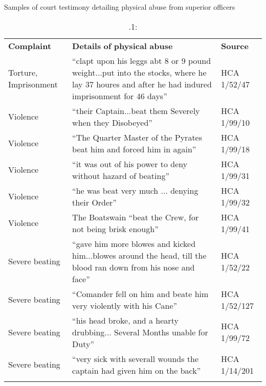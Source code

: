 \begin{table}
\caption{\label{tab:key:4}.1:} Samples of court testimony detailing physical abuse from superior officers

\begin{tabularx}{\textwidth}{XXX}
\lsptoprule

\textbf{Complaint} & \textbf{Details} \textbf{of} \textbf{physical} \textbf{abuse} & \textbf{Source}\\
Torture, Imprisonment & “clapt upon his leggs abt 8 or 9 pound weight...put into the stocks, where he lay 37 houres and after he had indured imprisonment for 46 days” & HCA 1/52/47\\
Violence & “their Captain...beat them Severely when they Disobeyed” & HCA 1/99/10\\
Violence & “The Quarter Master of the Pyrates beat him and forced him in again” & HCA 1/99/18\\
Violence & “it was out of his power to deny without hazard of beating” & HCA 1/99/31\\
Violence & “he was beat very much ... denying their Order” & HCA 1/99/32\\
Violence & The Boatswain “beat the Crew, for not being brisk enough” & HCA 1/99/41\\
Severe beating & “gave him more blowes and kicked him...blowes around the head, till the blood ran down from his nose and face” & HCA 1/52/22\\
Severe beating & “Comander fell on him and beate him very violently with his Cane” & HCA 1/52/127\\
Severe beating & “his head broke, and a hearty drubbing... Several Months unable for Duty” & HCA 1/99/72\\
Severe beating & “very sick with severall wounds the captain had given him on the back” & HCA 1/14/201\\
\lspbottomrule
\end{tabularx}
\end{table}


